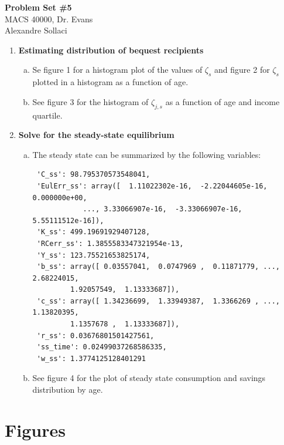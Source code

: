 \documentclass[letterpaper,12pt]{article}
\theoremstyle{definition}
\begin{document}
\begin{flushleft}
   \textbf{\large{Problem Set \#5}} \\
   MACS 40000, Dr. Evans \\
   Alexandre Sollaci
\end{flushleft}

\vspace{5mm}

\noindent\begin{enumerate}
   \item \textbf{Estimating distribution of bequest recipients}
 	\begin{enumerate}[(a)]
 	\item Se figure 1 for a histogram plot of the values of $\zeta_s$ and figure 2 for $\zeta_s$ plotted in a histogram as a function of age.
 	\item See figure 3 for the histogram of $\zeta_{j,s}$ as a function of age and income quartile.
 	\end{enumerate}
 	
 	\item \textbf{Solve for the steady-state equilibrium}
 	\begin{enumerate}[(a)]
 	\item The steady state can be summarized by the following variables:
 	\begin{verbatim}
 'C_ss': 98.795370573548041,
 'EulErr_ss': array([  1.11022302e-16,  -2.22044605e-16,   0.000000e+00,
            ..., 3.33066907e-16,  -3.33066907e-16,   5.55111512e-16]),
 'K_ss': 499.19691929407128,
 'RCerr_ss': 1.3855583347321954e-13,
 'Y_ss': 123.75521653825174,
 'b_ss': array([ 0.03557041,  0.0747969 ,  0.11871779, ...,  2.68224015,
         1.92057549,  1.13333687]),
 'c_ss': array([ 1.34236699,  1.33949387,  1.3366269 , ...,  1.13820395,
         1.1357678 ,  1.13333687]),
 'r_ss': 0.03676801501427561,
 'ss_time': 0.02499037268586335,
 'w_ss': 1.3774125128401291
 	\end{verbatim}
 	\item See figure 4 for the plot of steady state consumption and savings distribution by age.
 	\end{enumerate}
 	
\end{enumerate}

\clearpage
\appendix

\section{Figures}
\end{document}

